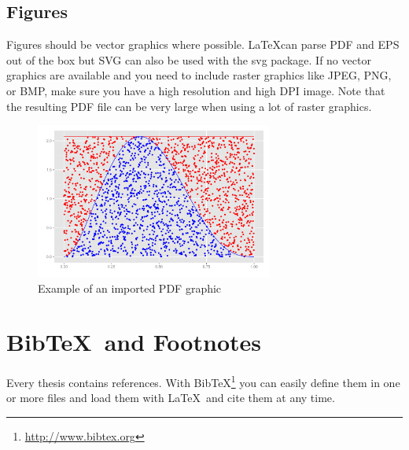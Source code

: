 \documentclass[masterarbeit,grey]{mas-thesis-sections}				%
\begin{document}
\subsection{Figures}

Figures should be vector graphics where possible. \LaTeX can parse PDF and EPS out of the box but SVG can also be used with the svg package. If no vector graphics are available and you need to include raster graphics like JPEG, PNG, or BMP, make sure you have a high resolution and high DPI image. Note that the resulting PDF file can be very large when using a lot of raster graphics.

\begin{figure}[ht]
	\centering
	\includegraphics[height=5.1cm]{graphics/demo-graphic.pdf}
	\caption{Example of an imported PDF graphic}
	\label{figure:1}
\end{figure}

\newpage

\section{Bib\TeX\ and Footnotes}

Every thesis contains references. With Bib\TeX\footnote{\url{http://www.bibtex.org}} you can easily define them in one or more files and load them with \LaTeX\ and cite them at any time.\cite{exampleBook}
\cleardoublepage

\printbibliography[heading=bibintoc]
\end{document}
